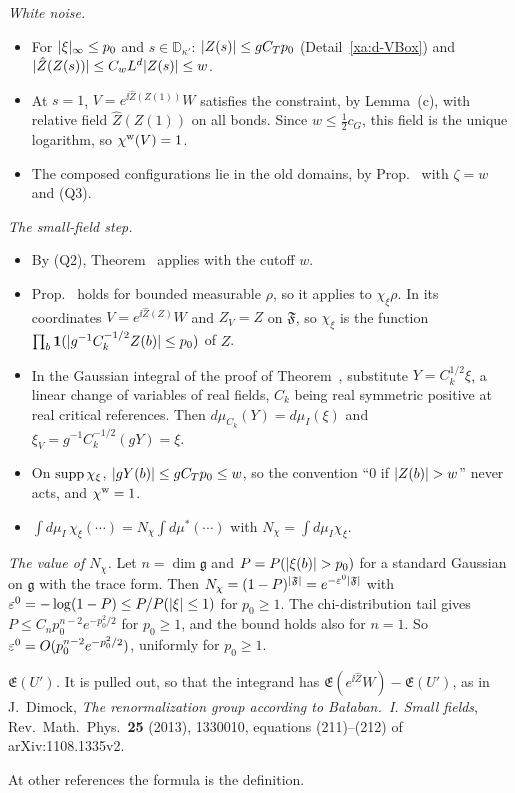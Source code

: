 \begin{detail}\label{xa:d-sfstep}
\emph{White noise.}
\begin{itemize}
\item For $\lvert\xi\rvert_\infty\le p_0$ and $s\in\mathbb D_{\kappa'}$: $\lvert Z(s)\rvert\le gC_Tp_0$ (Detail~\ref{xa:d-VBox}) and $\lvert\hat Z(Z(s))\rvert\le C_wL^d\lvert Z(s)\rvert\le w$.
\item At $s=1$, $V=e^{\ii\hat Z(Z(1))}W$ satisfies the constraint, by Lemma~(c), with relative field $\hat Z(Z(1))$ on all bonds. Since $w\le\frac12c_G$, this field is the unique logarithm, so $\chi^{\rm w}(V)=1$.
\item The composed configurations lie in the old domains, by Prop.~ with $\zeta=w$ and (Q3).
\end{itemize}

\emph{The small-field step.}
\begin{itemize}
\item By (Q2), Theorem~ applies with the cutoff $w$.
\item Prop.~ holds for bounded measurable $\rho$, so it applies to $\chi_\xi\rho$. In its coordinates $V=e^{\ii\hat Z(Z)}W$ and $Z_V=Z$ on $\mathfrak F$, so $\chi_\xi$ is the function $\prod_b\mathbf 1(\lvert g^{-1}C_k^{-1/2}Z(b)\rvert\le p_0)$ of $Z$.
\item In the Gaussian integral of the proof of Theorem~, substitute $Y=C_k^{1/2}\xi$, a linear change of variables of real fields, $C_k$ being real symmetric positive at real critical references. Then $d\mu_{C_k}(Y)=d\mu_I(\xi)$ and $\xi_V=g^{-1}C_k^{-1/2}(gY)=\xi$.
\item On $\operatorname{supp}\chi_\xi$, $\lvert gY(b)\rvert\le gC_Tp_0\le w$, so the convention ``$0$ if $\lvert Z(b)\rvert>w$'' never acts, and $\chi^{\rm w}=1$.
\item $\int d\mu_I\,\chi_\xi(\cdots)=N_\chi\int d\mu^*(\cdots)$ with $N_\chi=\int d\mu_I\chi_\xi$.
\end{itemize}

\emph{The value of $N_\chi$.} Let $n=\dim\mathfrak g$ and $P=P(\lvert\xi(b)\rvert>p_0)$ for a standard Gaussian on $\mathfrak g$ with the trace form. Then $N_\chi=(1-P)^{\lvert\mathfrak F\rvert}=e^{-\varepsilon^0\lvert\mathfrak F\rvert}$ with $\varepsilon^0=-\log(1-P)\le P/P(\lvert\xi\rvert\le1)$ for $p_0\ge1$. The chi-distribution tail gives $P\le C_np_0^{n-2}e^{-p_0^2/2}$ for $p_0\ge1$, and the bound holds also for $n=1$. So $\varepsilon^0=O(p_0^{n-2}e^{-p_0^2/2})$, uniformly for $p_0\ge1$.

\emph{$\mathfrak E(U')$.} It is pulled out, so that the integrand has $\mathfrak E(e^{\ii\hat Z}W)-\mathfrak E(U')$, as in J.~Dimock, \emph{The renormalization group according to Ba\l aban.~I. Small fields}, Rev.\ Math.\ Phys.\ \textbf{25} (2013), 1330010, equations (211)--(212) of arXiv:1108.1335v2.

At other references the formula is the definition.
\end{detail}

